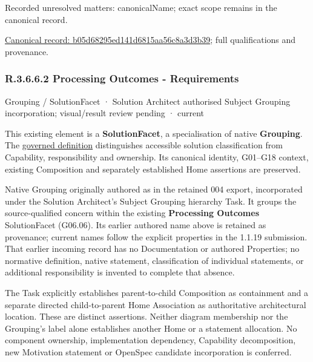 {\small Recorded unresolved matters: canonicalName; exact scope remains in the canonical record.}\par
{\footnotesize \href{../../../../../../../continuum/grouping/b05d68295ed141d6815aa56c8a3d3b39.md}{Canonical record: b05d68295ed141d6815aa56c8a3d3b39}; full qualifications and provenance.}\par
\subsubsection*{R.3.6.6.2 Processing Outcomes - Requirements}
\label{navigation:R.3.6.6.2}

\label{element:477d6408de0642fc875ce79d8e9dee86}
{\small Grouping / SolutionFacet · Solution Architect authorised Subject Grouping incorporation; visual/result review pending · current}\par

This existing element is a \textbf{SolutionFacet}, a specialisation of native
\textbf{Grouping}. The \href{\detokenize{../../../../../../../governance/continuum-representation.md#solutionfacet-classification--1119-candidate}}{governed definition}
distinguishes accessible solution classification from Capability, responsibility
and ownership. Its canonical identity, G01–G18 context, existing Composition
and separately established Home assertions are preserved.



Native Grouping originally authored as \texttt{} in the retained 004 export,
incorporated under the Solution Architect's Subject Grouping hierarchy Task.
It groups the source-qualified \texttt{} concern within
the existing \textbf{Processing Outcomes} SolutionFacet (G06.06). Its earlier authored name above is retained as provenance; current names
follow the explicit properties in the 1.1.19 submission.
That earlier incoming record has no Documentation or authored Properties; no normative
definition, native statement, classification of individual statements, or
additional responsibility is invented to complete that absence.



The Task explicitly establishes parent-to-child Composition as containment and
a separate directed child-to-parent Home Association as authoritative architectural
location. These are distinct assertions. Neither diagram membership nor the
Grouping's label alone establishes another Home or a statement allocation.
No component ownership, implementation dependency, Capability decomposition,
new Motivation statement or OpenSpec candidate incorporation is conferred.



